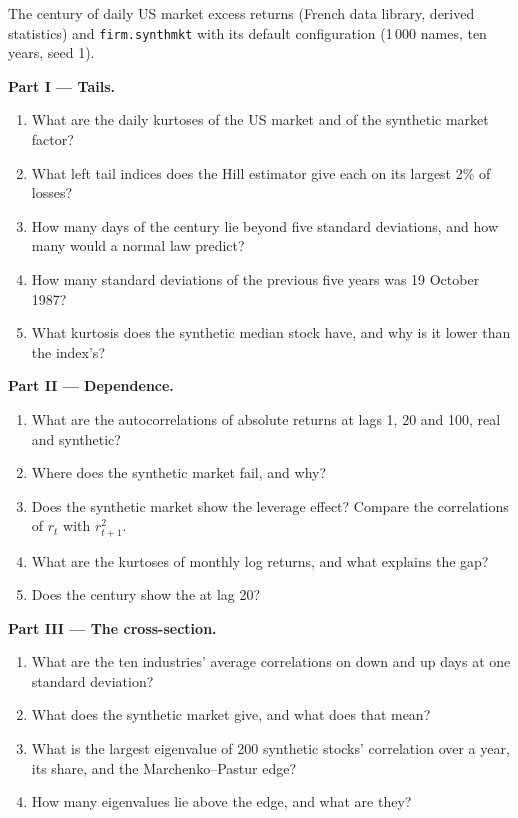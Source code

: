 \begin{problem}\label{pb:rs:stylised-facts-of-returns:1}
The century of daily US market excess returns (French data library, derived statistics) and \texttt{firm.synthmkt} with its default
configuration (1\,000 names, ten years, seed 1).

\medskip\noindent\textbf{Part I --- Tails.}
\begin{enumerate}
\item What are the daily kurtoses of the US market and of the synthetic market factor?
\item What left tail indices does the Hill estimator give each on its largest 2\% of losses?
\item How many days of the century lie beyond five standard deviations, and how many would a normal law predict?
\item How many standard deviations of the previous five years was 19 October 1987?
\item What kurtosis does the synthetic median stock have, and why is it lower than the index's?
\end{enumerate}

\medskip\noindent\textbf{Part II --- Dependence.}
\begin{enumerate}[resume]
\item What are the autocorrelations of absolute returns at lags 1, 20 and 100, real and synthetic?
\item Where does the synthetic market fail, and why?
\item Does the synthetic market show the leverage effect? Compare the correlations of $r_t$ with $r^2_{t+1}$.
\item What are the kurtoses of monthly log returns, and what explains the gap?
\item Does the century show the  at lag 20?
\end{enumerate}

\medskip\noindent\textbf{Part III --- The cross-section.}
\begin{enumerate}[resume]
\item What are the ten industries' average correlations on down and up days at one standard deviation?
\item What does the synthetic market give, and what does that mean?
\item What is the largest eigenvalue of 200 synthetic stocks' correlation over a year, its share, and the Marchenko--Pastur edge?
\item How many eigenvalues lie above the edge, and what are they?
\end{enumerate}


\end{problem}
